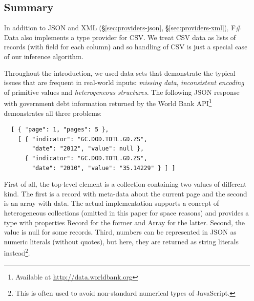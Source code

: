 \documentclass[10pt,preprint,blind,clearpagebib]{sigplanconf}
\newcommand{\kvd}[1]{\textnormal{\textcolor{kvdclr}{\sffamily #1}}}
\newcommand{\ident}[1]{\textnormal{\sffamily #1}}
\begin{document}
\subsection{Summary}
In addition to JSON and XML (\S\ref{sec:providers-json}, \S\ref{sec:providers-xml}), F\# Data also 
implements a type provider for CSV. We treat CSV data as lists of records (with field for each 
column) and so handling of CSV is just a special case of our inference algorithm.

Throughout the introduction, we used data sets that demonstrate the typical issues that are frequent
in real-world inputs: \emph{missing data}, \emph{inconsistent encoding} of primitive values and 
\emph{heterogeneous structures}. The following JSON response with 
government debt information returned by the World Bank API\footnote{Available at 
\url{http://data.worldbank.org}} demonstrates all three problems:
%
{\small{
\begin{verbatim}
  [ { "page": 1, "pages": 5 },
    [ { "indicator": "GC.DOD.TOTL.GD.ZS",
        "date": "2012", "value": null },
      { "indicator": "GC.DOD.TOTL.GD.ZS",
        "date": "2010", "value": "35.14229" } ] ]
\end{verbatim}
}}
%
\noindent
First of all, the top-level element is a collection containing two values of different kind.
The first is a record with meta-data about the current page and the second is an array with data. 
The actual implementation supports a concept of heterogeneous collections (omitted in this paper
for space reasons) and provides a type with properties \ident{Record} for the former and 
\ident{Array} for the latter. Second, the \ident{value} is \kvd{null} for some records. Third, 
numbers can be represented in JSON as numeric literals (without quotes), but here, they are 
returned as string literals instead\footnote{This is often used to avoid non-standard numerical 
types of JavaScript.}.



%
%
\end{document}
